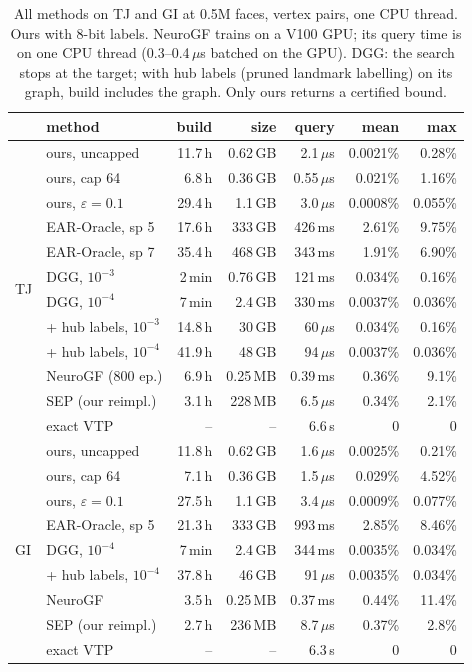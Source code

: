 \documentclass[sigconf,nonacm,screen]{acmart}
\newcommand{\eps}{\varepsilon}
\begin{document}
\begin{table}[t]
\caption{All methods on TJ and GI at 0.5M faces, vertex pairs, one CPU thread. Ours with 8-bit labels. NeuroGF
trains on a V100 GPU; its query time is on one CPU thread (0.3--0.4\,$\mu$s batched on the GPU). DGG: the search
stops at the target; with hub labels (pruned landmark labelling) on its graph, build includes the graph. Only ours returns
a certified bound.}
\label{tab:server-comp}
\small
\setlength{\tabcolsep}{3pt}
\begin{tabular}{@{}llrrrrr@{}}
\toprule
 & method & build & size & query & mean & max\\
\midrule
\multirow{12}{*}{TJ} & ours, uncapped & 11.7\,h & 0.62\,GB & 2.1\,$\mu$s & 0.0021\% & 0.28\%\\
 & ours, cap 64 & 6.8\,h & 0.36\,GB & 0.55\,$\mu$s & 0.021\% & 1.16\%\\
 & ours, $\eps=0.1$ & 29.4\,h & 1.1\,GB & 3.0\,$\mu$s & 0.0008\% & 0.055\%\\
 & EAR-Oracle, sp 5 & 17.6\,h & 333\,GB & 426\,ms & 2.61\% & 9.75\%\\
 & EAR-Oracle, sp 7 & 35.4\,h & 468\,GB & 343\,ms & 1.91\% & 6.90\%\\
 & DGG, $10^{-3}$ & 2\,min & 0.76\,GB & 121\,ms & 0.034\% & 0.16\%\\
 & DGG, $10^{-4}$ & 7\,min & 2.4\,GB & 330\,ms & 0.0037\% & 0.036\%\\
 & + hub labels, $10^{-3}$ & 14.8\,h & 30\,GB & 60\,$\mu$s & 0.034\% & 0.16\%\\
 & + hub labels, $10^{-4}$ & 41.9\,h & 48\,GB & 94\,$\mu$s & 0.0037\% & 0.036\%\\
 & NeuroGF (800 ep.) & 6.9\,h & 0.25\,MB & 0.39\,ms & 0.36\% & 9.1\%\\
 & SEP (our reimpl.) & 3.1\,h & 228\,MB & 6.5\,$\mu$s & 0.34\% & 2.1\%\\
 & exact VTP & -- & -- & 6.6\,s & 0 & 0\\
\midrule
\multirow{9}{*}{GI} & ours, uncapped & 11.8\,h & 0.62\,GB & 1.6\,$\mu$s & 0.0025\% & 0.21\%\\
 & ours, cap 64 & 7.1\,h & 0.36\,GB & 1.5\,$\mu$s & 0.029\% & 4.52\%\\
 & ours, $\eps=0.1$ & 27.5\,h & 1.1\,GB & 3.4\,$\mu$s & 0.0009\% & 0.077\%\\
 & EAR-Oracle, sp 5 & 21.3\,h & 333\,GB & 993\,ms & 2.85\% & 8.46\%\\
 & DGG, $10^{-4}$ & 7\,min & 2.4\,GB & 344\,ms & 0.0035\% & 0.034\%\\
 & + hub labels, $10^{-4}$ & 37.8\,h & 46\,GB & 91\,$\mu$s & 0.0035\% & 0.034\%\\
 & NeuroGF & 3.5\,h & 0.25\,MB & 0.37\,ms & 0.44\% & 11.4\%\\
 & SEP (our reimpl.) & 2.7\,h & 236\,MB & 8.7\,$\mu$s & 0.37\% & 2.8\%\\
 & exact VTP & -- & -- & 6.3\,s & 0 & 0\\
\bottomrule
\end{tabular}
\end{table}
\end{document}
